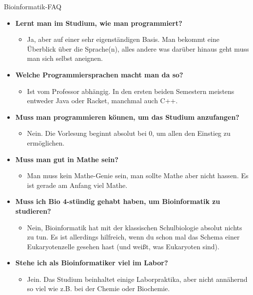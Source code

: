 \begin{LARGE}
	Bioinformatik-FAQ
\end{LARGE}
\begin{large}
	\begin{itemize}
		\item \textbf{Lernt man im Studium, wie man programmiert?}
		\begin{itemize}
			\item Ja, aber auf einer sehr eigenständigen Basis. Man bekommt eine Überblick über die Sprache(n), alles andere was darüber hinaus geht muss man sich selbst aneignen.
		\end{itemize}
	
		\item \textbf{Welche Programmiersprachen macht man da so?}
		\begin{itemize}
			\item Ist vom Professor abhängig. In den ersten beiden Semestern meistens entweder Java oder Racket, manchmal auch C++.
		\end{itemize}
	
		\item \textbf{Muss man programmieren können, um das Studium anzufangen?}
		\begin{itemize}
			\item Nein. Die Vorlesung beginnt absolut bei 0, um allen den Einstieg zu ermöglichen.
		\end{itemize}
	
		\item \textbf{Muss man gut in Mathe sein?}
		\begin{itemize}
			\item Man muss kein Mathe-Genie sein, man sollte Mathe aber nicht hassen. Es ist gerade am Anfang viel Mathe.
		\end{itemize}

				\item \textbf{Muss ich Bio 4-stündig gehabt haben, um Bioinformatik zu studieren?}
				\begin{itemize}
					\item Nein, Bioinformatik hat mit der klassischen Schulbiologie absolut nichts zu tun. Es ist allerdings hilfreich, wenn du schon mal das Schema einer Eukaryotenzelle gesehen hast (und weißt, was Eukaryoten sind).
				\end{itemize}
		
			\item \textbf{Stehe ich als Bioinformatiker viel im Labor?}
			\begin{itemize}
				\item Jein. Das Studium beinhaltet einige Laborpraktika, aber nicht annähernd so viel wie z.B. bei der Chemie oder Biochemie.
			\end{itemize}
	

\end{itemize}
\end{large}
